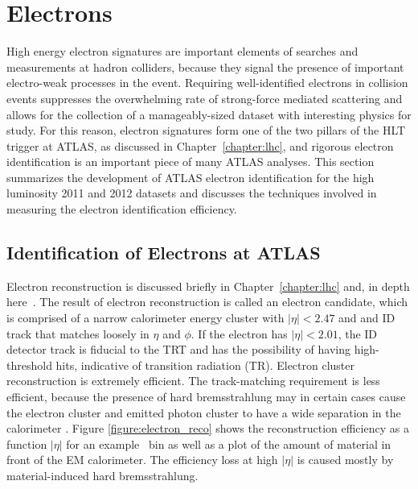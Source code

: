 \chapter[Electrons][Electrons]{Electrons}
\label{chapter:electron} 

High energy electron signatures are important elements of searches and measurements at hadron colliders, because they signal the presence of important electro-weak processes in the event. Requiring well-identified electrons in collision events suppresses the overwhelming rate of strong-force mediated scattering and allows for the collection of a manageably-sized dataset with interesting physics for study. For this reason, electron signatures form one of the two pillars of the HLT trigger at ATLAS, as discussed in Chapter~\ref{chapter:lhc}, and rigorous electron identification is an important piece of many ATLAS analyses. This section summarizes the development of ATLAS electron identification for the high luminosity 2011 and 2012 datasets and discusses the techniques involved in measuring the electron identification efficiency. 

\section{Identification of Electrons at ATLAS}


Electron reconstruction is discussed briefly in Chapter~\ref{chapter:lhc} and, in depth here~\cite{ATLAS-CONF-2014-032}. The result of electron reconstruction is called an electron candidate, which is comprised of a narrow calorimeter energy cluster with $|\eta| < 2.47$ and and ID track that matches loosely in $\eta$ and $\phi$. If the electron has $|\eta| < 2.01$, the ID detector track is fiducial to the TRT and has the possibility of having high-threshold hits, indicative of transition radiation (TR). Electron cluster reconstruction is extremely efficient. The track-matching requirement is less efficient, because the presence of hard bremsstrahlung may in certain cases cause the electron cluster and emitted photon cluster to have a wide separation in the calorimeter \cite{ATLAS-CONF-2012-047}. Figure \ref{figure:electron_reco} shows the reconstruction efficiency as a function $|\eta|$ for an example \pt\ bin as well as a plot of the amount of material in front of the EM calorimeter. The efficiency loss at high $|\eta|$ is caused mostly by material-induced hard bremsstrahlung.  

